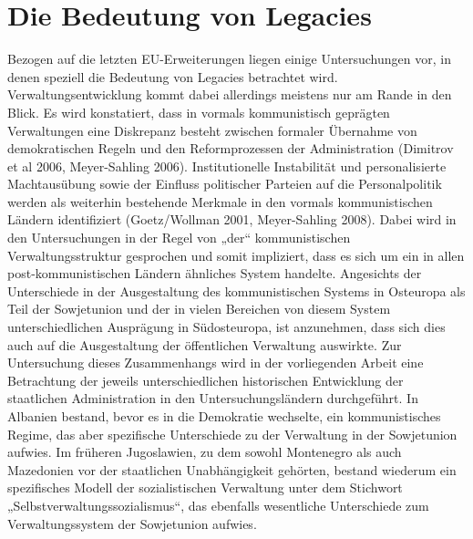 \section{Die Bedeutung von Legacies}
Bezogen auf die letzten EU-Erweiterungen liegen einige Untersuchungen vor, in denen speziell die Bedeutung von Legacies betrachtet wird. Verwaltungsentwicklung kommt dabei allerdings meistens nur am Rande in den Blick. Es wird konstatiert, dass in vormals kommunistisch geprägten Verwaltungen eine Diskrepanz besteht zwischen formaler Übernahme von demokratischen Regeln und den Reformprozessen der Administration (Dimitrov et al 2006, Meyer-Sahling 2006). Institutionelle Instabilität und personalisierte Machtausübung sowie der Einfluss politischer Parteien auf die Personalpolitik werden als weiterhin bestehende Merkmale in den vormals kommunistischen Ländern identifiziert (Goetz/Wollman 2001, Meyer-Sahling 2008). Dabei wird in den Untersuchungen in der Regel von „der“ kommunistischen Verwaltungsstruktur gesprochen und somit impliziert, dass es sich um ein in allen post-kommunistischen Ländern ähnliches System handelte. Angesichts der Unterschiede in der Ausgestaltung des kommunistischen Systems in Osteuropa als Teil der Sowjetunion und der in vielen Bereichen von diesem System unterschiedlichen Ausprägung in Südosteuropa, ist anzunehmen, dass sich dies auch auf die Ausgestaltung der öffentlichen Verwaltung auswirkte. Zur Untersuchung dieses Zusammenhangs wird in der vorliegenden Arbeit eine Betrachtung der jeweils unterschiedlichen historischen Entwicklung der staatlichen Administration in den Untersuchungsländern durchgeführt. In Albanien bestand, bevor es in die Demokratie wechselte, ein kommunistisches Regime, das aber spezifische Unterschiede zu der Verwaltung in der Sowjetunion aufwies. Im früheren Jugoslawien, zu dem sowohl Montenegro als auch Mazedonien vor der staatlichen Unabhängigkeit gehörten, bestand wiederum ein spezifisches Modell der sozialistischen Verwaltung unter dem Stichwort „Selbstverwaltungssozialismus“, das ebenfalls wesentliche Unterschiede zum Verwaltungssystem der Sowjetunion aufwies.\par


